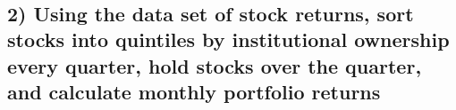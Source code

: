 \documentclass[11pt]{article}
\begin{document}
    \begin{center}
    \end{center}
    { \hspace*{\fill} \\}
    
    \hypertarget{using-the-data-set-of-stock-returns-sort-stocks-into-quintiles-by-institutional-ownership-every-quarter-hold-stocks-over-the-quarter-and-calculate-monthly-portfolio-returns}{%
\subsection{2) Using the data set of stock returns, sort stocks into
quintiles by institutional ownership every quarter, hold stocks over the
quarter, and calculate monthly portfolio
returns}\label{using-the-data-set-of-stock-returns-sort-stocks-into-quintiles-by-institutional-ownership-every-quarter-hold-stocks-over-the-quarter-and-calculate-monthly-portfolio-returns}}
\end{document}

